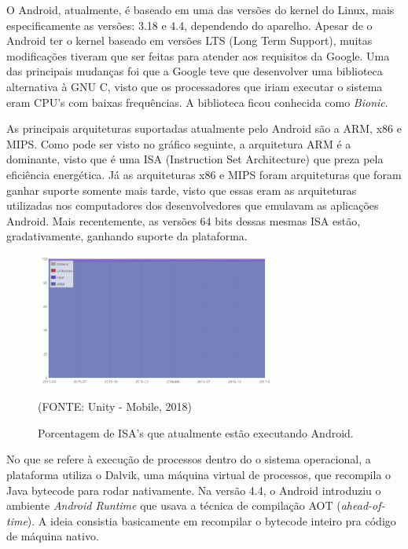 \documentclass[
    12pt,       %
    openright,      %
    twoside,      %
    a4paper,      %
    english,      %
    french,       %
    spanish,      %
    brazil,       %
    ]{abntex2}
\begin{document}
        O Android, atualmente, é baseado em uma das versões do kernel do Linux, mais especificamente
        as versões: 3.18 e 4.4, dependendo do aparelho. Apesar de o Android ter o kernel baseado
        em versões LTS (Long Term Support), muitas modificações tiveram que ser feitas para atender
        aos requisitos da Google. Uma das principais mudanças foi que a Google teve que desenvolver
        uma biblioteca alternativa à GNU C, visto que os processadores que iriam executar o sistema
        eram CPU's com baixas frequências. A biblioteca ficou conhecida como \textit{Bionic}.

        As principais arquiteturas suportadas atualmente pelo Android são a ARM, x86 e MIPS. Como
        pode ser visto no gráfico seguinte, a arquitetura ARM é a dominante, visto que é uma ISA
        (Instruction Set Architecture) que preza pela eficiência energética. Já as arquiteturas
        x86 e MIPS foram arquiteturas que foram ganhar suporte somente mais tarde, visto que essas eram
        as arquiteturas utilizadas nos computadores dos desenvolvedores que emulavam as aplicações
        Android. Mais recentemente, as versões 64 bits dessas mesmas ISA estão, gradativamente,
        ganhando suporte da plataforma.

        \begin{figure}[htbp]
            \begin{center}
                \includegraphics[width=0.7\textwidth]{img/cpusPercentage.png}
            \end{center}
        \caption{\label{fig:passaro}Porcentagem de ISA's que atualmente estão executando Android.}
        \begin{center}(FONTE: Unity - Mobile, 2018)\end{center}
        \end{figure}

        No que se refere à execução de processos dentro do o sistema operacional, a plataforma
        utiliza o Dalvik, uma máquina virtual de processos, que recompila o Java bytecode para
        rodar nativamente. Na versão 4.4, o Android introduziu o ambiente \textit{Android Runtime}
        que usava a técnica de compilação AOT (\textit{ahead-of-time}). A ideia consistia
        basicamente em recompilar o bytecode inteiro pra código de máquina nativo.
\end{document}
